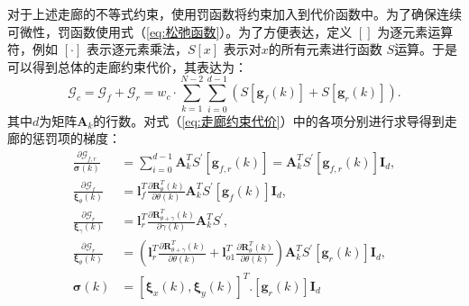 \documentclass[master,academic]{ysuthesis} %
\begin{document}
		对于上述走廊的不等式约束，使用罚函数将约束加入到代价函数中。为了确保连续可微性，罚函数使用式（\ref{eq:松弛函数}）。为了方便表达，定义 \([]\) 为逐元素运算符，例如 \([\cdot]\) 表示逐元素乘法，\(S[x]\) 表示对$x$的所有元素进行函数 \(S\)运算。于是可以得到总体的走廊约束代价，其表达为：
		\begin{equation}
			\mathcal{G}_c =\mathcal{G}_{f}+\mathcal{G}_{r}=w_{c}\cdot \sum_{k=1}^{N-2}\sum_{i=0}^{d-1}(S[\bm{g}_{f}(k)] + S[\bm{g}_{r}(k)]).\label{eq:走廊约束代价}
		\end{equation}
		其中$d$为矩阵$\bm{A}_k$的行数。对式（\ref{eq:走廊约束代价}）中的各项分别进行求导得到走廊的惩罚项的梯度：
		\begin{equation}
			\begin{aligned}
				\frac{\partial \mathcal{G}_{f,r}}{\bm{\sigma} \left( k \right)}&=\sum_{i=0}^{d-1}{\bm{A}}_{k}^{T}S^{'}\left[ \bm{g}_{f,r}\left( k \right) \right] =\bm{A}_{k}^{T}S^{'}\left[ \bm{g}_{f,r}\left( k \right) \right] \bm{I}_d,\\
				\frac{\partial \mathcal{G}_f}{\bm{\xi} _{\theta}\left( k \right)}&=\bm{l}_{f}^{T}\frac{\partial \bm{R}_{\theta}^{T}\left( k \right)}{\partial \theta \left( k \right)}\bm{A}_{k}^{T}S^{'}\left[ \bm{g}_{f}\left( k \right) \right] \bm{I}_d,\\
				\frac{\partial \mathcal{G}_r}{\bm{\xi} _{\gamma}\left( k \right)}&=\bm{l}_{r}^{T}\frac{\partial \bm{R}_{\theta +\gamma}^{T}\left( k \right)}{\partial \gamma \left( k \right)}\bm{A}_{k}^{T}S^{'},\\
				\frac{\partial \mathcal{G}_r}{\bm{\xi} _{\theta}\left( k \right)}&=\left( \bm{l}_{r}^{T}\frac{\partial \bm{R}_{\theta +\gamma}^{T}\left( k \right)}{\partial \theta \left( k \right)}+\bm{l}_{o1}^{T}\frac{\partial \bm{R}_{\theta}^{T}\left( k \right)}{\partial \theta \left( k \right)} \right) \bm{A}_{k}^{T}S^{'}\left[ \bm{g}_{r}\left( k \right) \right] \bm{I}_d,\\
				\bm{\sigma} \left( k \right) &=\left[ \bm{\xi} _x\left( k \right) ,\bm{\xi} _y\left( k \right) \right] ^T.\left[ \bm{g}_{r}\left( k \right) \right] \bm{I}_d
			\end{aligned}
		\end{equation}
		
\end{document}
